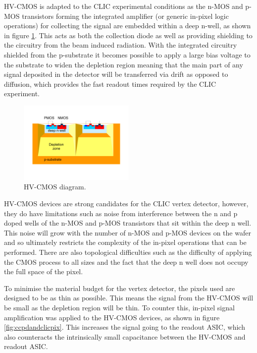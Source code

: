 HV-CMOS is adapted to the CLIC experimental conditions as the n-MOS and p-MOS transistors forming the integrated amplifier (or generic in-pixel logic operations) for collecting the signal are embedded within a deep n-well, as shown in figure \ref{fig:hvcmos}.  This acts as both the collection diode as well as providing shielding to the circuitry from the beam induced radiation.  With the integrated circuitry shielded from the p-substrate it becomes possible to apply a large bias voltage to the substrate to widen the depletion region meaning that the main part of any signal deposited in the detector will be transferred via drift as opposed to diffusion, which provides the fast readout times required by the CLIC experiment.  

\begin{figure}
\centering
\includegraphics[width=0.5\textwidth]{CLICdpVertex/Plots/HV-CMOSDiagram.pdf}
\caption[HV-CMOS diagram.]{HV-CMOS diagram.}
\label{fig:hvcmos}
\end{figure}

HV-CMOS devices are strong candidates for the CLIC vertex detector, however, they do have limitations such as noise from interference between the n and p doped wells of the n-MOS and p-MOS transistors that sit within the deep n well.  This noise will grow with the number of n-MOS and p-MOS devices on the wafer and so ultimately restricts the complexity of the in-pixel operations that can be performed.  There are also topological difficulties such as the difficulty of applying the CMOS process to all sizes and the fact that the deep n well does not occupy the full space of the pixel.  

To minimise the material budget for the vertex detector, the pixels used are designed to be as thin as possible.  This means the signal from the HV-CMOS will be small as the depletion region will be thin.  To counter this, in-pixel signal amplification was applied to the HV-CMOS devices, as shown in figure \ref{fig:ccpdandclicpix}.  This increases the signal going to the readout ASIC, which also counteracts the intrinsically small capacitance between the HV-CMOS and readout ASIC.

